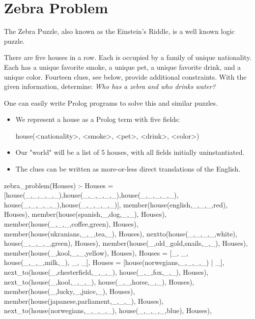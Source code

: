 \section{Zebra Problem}\label{subsec:zebra}
The Zebra Puzzle, also known as the Einstein's Riddle, is a well known logic puzzle. 
\smallv

There are five houses in a row. Each is occupied by a family of unique nationality. Each has a unique favorite smoke, a unique pet, a unique favorite drink, and a unique color. Fourteen clues, see below, provide additional constraints. With the given information, determine: \textit{Who has a zebra and who drinks water?}
\smallv

One can easily write Prolog programs to solve this and similar puzzles.
\begin{itemize}[label=$\bullet$]
\item We represent a house as a Prolog term with five fields:
\smallv

\begin{python}
    house(<nationality>, <smoke>, <pet>, <drink>, <color>)
\end{python}
\item Our "world" will be a list of 5 houses, with all fields initially uninstantiated.  
\smallv

\item The clues can be written as more-or-less direct translations of the English.
\end{itemize}

\begin{python}
zebra_problem(Houses) :-
    Houses = [house(_,_,_,_,_),house(_,_,_,_,_),house(_,_,_,_,_),
              house(_,_,_,_,_),house(_,_,_,_,_)],
    member(house(english,_,_,_,red), Houses),
    member(house(spanish,_,dog,_,_), Houses),
    member(house(_,_,_,coffee,green), Houses),
    member(house(ukranians,_,_,tea,_), Houses),
    nextto(house(_,_,_,_,white), house(_,_,_,_,green), Houses),
    member(house(_,old_gold,snails,_,_), Houses),
    member(house(_,kool,_,_,yellow), Houses),
    Houses = [_, _, house(_,_,_,milk,_), _, _],
    Houses = [house(norwegians,_,_,_,_) | _],
    next_to(house(_,chesterfield,_,_,_), house(_,_,fox,_,_), Houses),
    next_to(house(_,kool,_,_,_), house(_,_,horse,_,_), Houses),
    member(house(_,lucky,_,juice,_), Houses),
    member(house(japanese,parliament,_,_,_), Houses),
    next_to(house(norwegians,_,_,_,_), house(_,_,_,_,blue), Houses),
\end{python}

